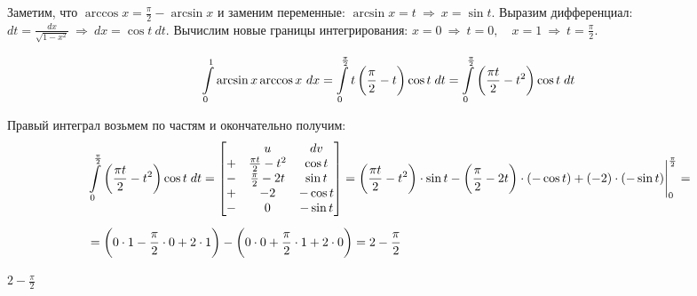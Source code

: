  {
    Заметим, что $\arccos x = \frac \pi 2 - \arcsin x$ и заменим переменные: $\arcsin x = t  \ \Rightarrow \ x= \sin t $. Выразим дифференциал: $\displaystyle dt = \frac {dx} {\sqrt{1-x^2}} \ \Rightarrow \ dx = \cos t \  dt$. Вычислим новые границы интегрирования: $\displaystyle x = 0 \ \Rightarrow \ t = 0,\quad x = 1 \ \Rightarrow \ t = \frac \pi 2$.
    
    $$\int \limits_0^1 \arcsin{x} \arccos{x} \ dx = \int \limits_0^{\frac \pi 2} t\lr{\frac \pi 2 - t}\cos t\;dt = \int \limits_0^{\frac \pi 2} \lr{\frac {\pi t} 2 - t^2}\cos t\;dt$$
    
    Правый интеграл возьмем по частям и окончательно получим:
    \begin{align*}
        & \int \limits_0^{\frac \pi 2} \lr{\frac {\pi t} 2 - t^2}\cos t\;dt = \left[ \begin{matrix}
            & u & dv \\
            + & \frac {\pi t} 2 - t^2 & \cos t \\
            - & \frac {\pi} 2 - 2t & \sin t \\
            + & -2 & -\cos t \\
            - & 0 & -\sin t \\
        \end{matrix} \right] =
        \eval{\lr{\frac {\pi t} 2 - t^2}\cdot \sin t - \lr{\frac {\pi} 2 - 2t} \cdot \lr{-\cos t} + \lr{-2} \cdot \lr{-\sin t}}_{0}^{\frac \pi 2} = \\[2mm]
        &= \lr{0 \cdot 1 - \frac \pi 2 \cdot 0 + 2 \cdot 1} - \lr{0 \cdot 0 + \frac \pi 2 \cdot 1 + 2 \cdot 0} = 2 - \frac \pi 2
    \end{align*}
}{ $2 - \frac \pi 2$ }\newpage

